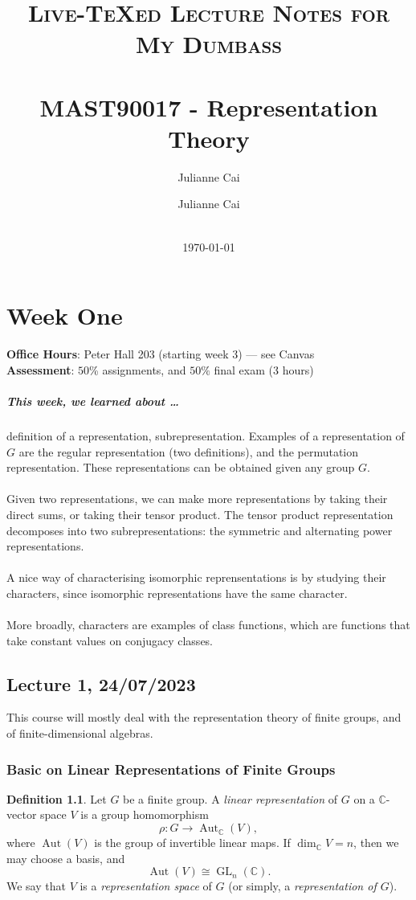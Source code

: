 \documentclass[a4paper]{report}
\author{
  Julianne Cai\\
}
\title{}
\date{\today}
\title{ \normalsize \textsc{Live-TeXed Lecture Notes for My Dumbass}
		\\ [2.0cm]
		\HRule{0.5pt} \\
		\LARGE \textbf{MAST90017 - Representation Theory}
		\HRule{2pt} \\ [0.5cm]
        }
\date{}
\author{
		Julianne Cai \\\\
        }
\theoremstyle{definition}
\newtheorem{definition}{Definition}
\theoremstyle{remark}
\theoremstyle{proposition}
\theoremstyle{conjecture}
\theoremstyle{lemma}
\theoremstyle{corollary}
\theoremstyle{exercise}
\theoremstyle{example}
\newcommand{\C}{\mathbb{C}}
\newcommand{\on}{\operatorname}
\begin{document}
\maketitle
\tableofcontents

\chapter{Week One}

\textbf{Office Hours}: Peter Hall 203 (starting week 3) --- see Canvas\\
\textbf{Assessment}: $50$\% assignments, and $50\%$ final exam (3 hours)

\paragraph{This week, we learned about \ldots}definition of a 
representation, subrepresentation. Examples of a representation of 
$G$ are the regular representation (two definitions), and the permutation
representation. These representations can be obtained given any group $G$.\\\\
Given two representations, we can make more representations by taking
their direct sums, or taking their tensor product. The tensor product 
representation decomposes into two subrepresentations: the symmetric and 
alternating power representations.\\\\
A nice way of characterising isomorphic reprensentations is by studying 
their characters, since isomorphic representations have the same 
character. \\\\
More broadly, characters are examples of class functions, which are 
functions that take constant values on conjugacy classes. 

\section{Lecture 1, 24/07/2023}
This course will mostly deal with the representation theory of finite groups, 
and of finite-dimensional algebras. 

\subsection{Basic on Linear Representations of Finite Groups}


\begin{definition}
    Let $G$ be a finite group.
    A \emph{linear representation} of $G$ on a $\C$-vector space $V$ is 
    a group homomorphism 
    $$\rho: G \longrightarrow \on{Aut}_\C(V),$$
    where $\on{Aut}(V)$ is the group of invertible linear maps.
    If $\dim_\C V = n$, then we may choose a basis, and $$\on{Aut}(V) \cong \on{GL}_n(\C).$$
We say that $V$ is a \emph{representation space} of $G$ (or simply,
a \emph{representation of $G$}). 
\end{definition}
\end{document}
